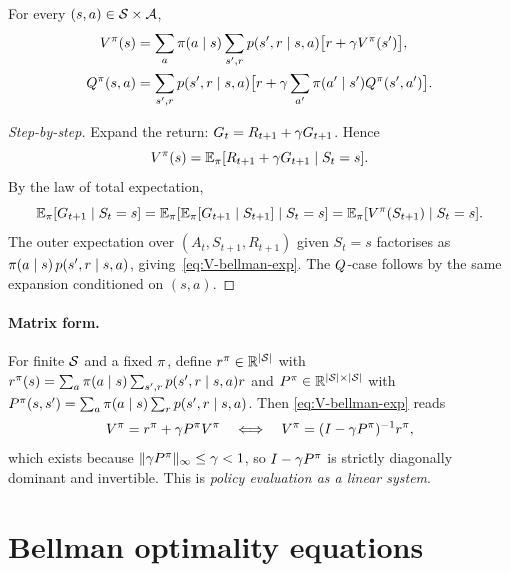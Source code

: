\documentclass[11pt,oneside]{scrbook}
\begin{document}
\begin{theorem}
\label{thm:bellman-exp}
For every $(s,a)\in\mathcal{S}\times\mathcal{A}$,
\begin{align}
V^\pi(s)   &= \sum_{a} \pi(a\mid s) \sum_{s', r} p(s', r\mid s, a)
                  \big[r + \gamma V^\pi(s')\big],
\label{eq:V-bellman-exp}\\
Q^\pi(s,a) &= \sum_{s', r} p(s', r\mid s, a)
                     \big[r + \gamma \sum_{a'} \pi(a'\mid s')Q^\pi(s', a')\big].
\label{eq:Q-bellman-exp}
\end{align}
\end{theorem}

\begin{proof}[Step-by-step]
Expand the return: $G_t = R_{t+1} + \gamma G_{t+1}$. Hence
\[
V^\pi(s) = \mathbb{E}_\pi[R_{t+1} + \gamma G_{t+1}\mid S_t=s].
\]
By the law of total expectation,
\[
\mathbb{E}_\pi[G_{t+1}\mid S_t=s] = \mathbb{E}_\pi\!\left[\mathbb{E}_\pi[G_{t+1}\mid S_{t+1}]\mid S_t=s\right]
   = \mathbb{E}_\pi[V^\pi(S_{t+1})\mid S_t=s].
\]
The outer expectation over $(A_t, S_{t+1}, R_{t+1})$ given $S_t=s$ factorises
as $\pi(a\mid s)\,p(s',r\mid s,a)$, giving~\eqref{eq:V-bellman-exp}. The
$Q$-case follows by the same expansion conditioned on $(s,a)$. \qedhere
\end{proof}

\paragraph{Matrix form.} For finite $\mathcal{S}$ and a fixed $\pi$, define
$r^\pi\in\mathbb{R}^{|\mathcal{S}|}$ with $r^\pi(s) = \sum_a \pi(a\mid s)\sum_{s',r}p(s',r\mid s,a)r$
and $P^\pi \in \mathbb{R}^{|\mathcal{S}|\times|\mathcal{S}|}$ with
$P^\pi(s,s') = \sum_a \pi(a\mid s)\sum_r p(s',r\mid s,a)$. Then
\eqref{eq:V-bellman-exp} reads
\begin{equation}
V^\pi = r^\pi + \gamma P^\pi V^\pi
\quad\Longleftrightarrow\quad
V^\pi = (I - \gamma P^\pi)^{-1} r^\pi,
\label{eq:V-linear-system}
\end{equation}
which exists because $\|{\gamma P^\pi}\|_\infty \le \gamma < 1$, so
$I - \gamma P^\pi$ is strictly diagonally dominant and invertible.
This is \emph{policy evaluation as a linear system}.

\section{Bellman optimality equations}
\end{document}
